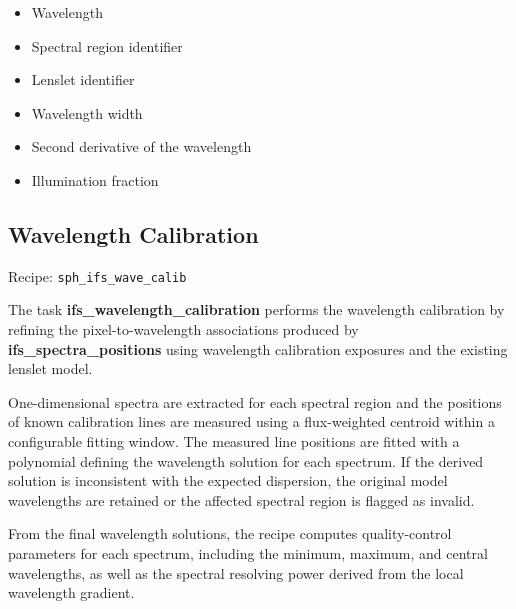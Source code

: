 \begin{itemize}
\item Wavelength
\item Spectral region identifier
\item Lenslet identifier
\item Wavelength width
\item Second derivative of the wavelength
\item Illumination fraction
\end{itemize}





\subsection{Wavelength Calibration}

Recipe:
\texttt{sph\_ifs\_wave\_calib}

The task \textbf{ifs\_wavelength\_calibration} performs the wavelength
calibration by refining the pixel-to-wavelength associations produced by
\textbf{ifs\_spectra\_positions} using wavelength calibration exposures
and the existing lenslet model.

One-dimensional spectra are extracted for each spectral region and the
positions of known calibration lines are measured using a flux-weighted
centroid within a configurable fitting window. The measured line positions
are fitted with a polynomial defining the wavelength solution for each
spectrum. If the derived solution is inconsistent with the expected
dispersion, the original model wavelengths are retained or the affected
spectral region is flagged as invalid.

From the final wavelength solutions, the recipe computes quality-control
parameters for each spectrum, including the minimum, maximum, and central
wavelengths, as well as the spectral resolving power derived from the local wavelength gradient.

